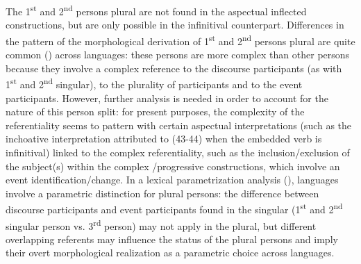 \documentclass[output=paper]{langsci/langscibook}
\begin{document}
The 1\textsuperscript{st} and 2\textsuperscript{nd} persons plural are not found in the aspectual inflected constructions, but are only possible in the infinitival counterpart. Differences in the pattern of the morphological derivation of 1\textsuperscript{st} and 2\textsuperscript{nd} persons plural are quite common (\citealt{Manzini2005,Manzini2011Bio}) across  languages: these persons are more complex than other persons \citep{Bobaljik2008Missing} because they involve a complex reference to the discourse participants (as with 1\textsuperscript{st} and 2\textsuperscript{nd} singular), to the plurality of participants and to the event participants. However, further analysis is needed in order to account for the nature of this person split: for present purposes, the complexity of the referentiality seems to pattern with certain aspectual interpretations (such as the inchoative interpretation attributed to (43-44) when the embedded verb is infinitival) linked to the complex referentiality, such as the inclusion\slash exclusion of the subject(s) within the complex \slash progressive constructions, which involve an event identification\slash change. In a lexical parametrization analysis (\citealt{Manzini2011Bio}), languages involve a parametric distinction for plural persons: the difference between discourse participants and event participants found in the singular (1\textsuperscript{st} and 2\textsuperscript{nd} singular person vs. 3\textsuperscript{rd} person) may not apply in the plural, but different overlapping referents may influence the status of the plural persons and imply their overt morphological realization as a parametric choice across languages.
\end{document}
